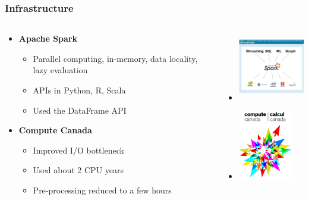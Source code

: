 \documentclass[slidestop,compress,red,mathserif]{beamer}
\newcommand{\colorcite}[1]{\colorlet{saved}{.}\color{sangria}\cite{#1}\color{saved}}
\begin{document}
\begin{frame}
  \frametitle{Infrastructure}
  \begin{columns}
  \begin{column}{0.6\textwidth}
  \begin{itemize}
    \item \textbf{Apache Spark} \colorcite{zaharia2010spark}       
    \begin{itemize}
    \item Parallel computing, in-memory, data locality, lazy evaluation
    \item APIs in Python, R, Scala
    \item Used the DataFrame API
    \end{itemize}
    \item \textbf{Compute Canada}
    \begin{itemize}
      \item Improved I/O bottleneck
      \item Used about 2 CPU years
      \item Pre-processing reduced to a few hours
    \end{itemize}
  \end{itemize}
  \end{column}
\begin{column}{0.4\textwidth}
  \begin{itemize}
  \item[] \includegraphics[height=3cm, keepaspectratio]{Figures/spark.png}
  \item[] \includegraphics[height=3cm, keepaspectratio]{Figures/cc-logo.png}
  \end{itemize}
\end{column}
\end{columns}
\end{frame}
\end{document}
